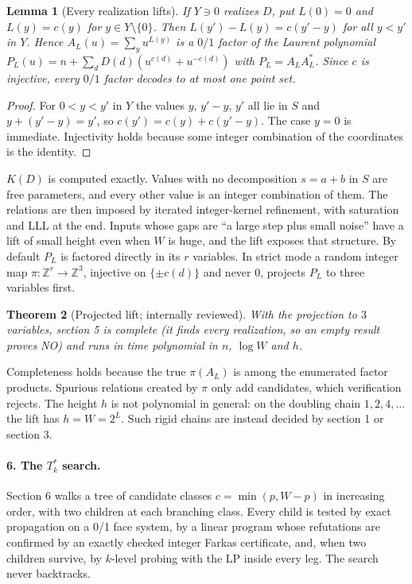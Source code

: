 \documentclass[11pt]{article}
\newtheorem{lemma}{Lemma}
\newtheorem{theorem}[lemma]{Theorem}
\theoremstyle{definition}
\newcommand{\Z}{\mathbb{Z}}
\begin{document}
\begin{lemma}[Every realization lifts]\label{lem:lift}
If $Y\ni 0$ realizes $D$, put $L(0)=0$ and $L(y)=c(y)$ for $y\in Y\setminus\{0\}$. Then $L(y')-L(y)=c(y'-y)$ for all
$y<y'$ in $Y$. Hence $A_L(u)=\sum_{y}u^{L(y)}$ is a $0/1$ factor of the Laurent polynomial
$P_L(u)=n+\sum_d D(d)(u^{c(d)}+u^{-c(d)})$ with $P_L=A_LA_L^*$. Since $c$ is injective, every $0/1$ factor decodes to
at most one point set.
\end{lemma}
\begin{proof}
For $0<y<y'$ in $Y$ the values $y$, $y'-y$, $y'$ all lie in $S$ and $y+(y'-y)=y'$, so $c(y')=c(y)+c(y'-y)$. The case
$y=0$ is immediate. Injectivity holds because some integer combination of the coordinates is the identity.
\end{proof}

$K(D)$ is computed exactly. Values with no decomposition $s=a+b$ in $S$ are free parameters, and every other value is an
integer combination of them. The relations are then imposed by iterated integer-kernel refinement, with saturation and
LLL at the end. Inputs whose gaps are ``a large step plus small noise'' have a lift of small height even when $W$ is
huge, and the lift exposes that structure. By default $P_L$ is factored directly in its $r$ variables. In strict mode a
random integer map $\pi:\Z^r\to\Z^3$, injective on $\{\pm c(d)\}$ and never $0$, projects $P_L$ to three variables
first.

\begin{theorem}[Projected lift; internally reviewed]\label{thm:t3r}
With the projection to $3$ variables, section 5 is complete (it finds every realization, so an empty result proves NO)
and runs in time polynomial in $n$, $\log W$ and $h$.
\end{theorem}

Completeness holds because the true $\pi(A_L)$ is among the enumerated factor products. Spurious relations created by
$\pi$ only add candidates, which verification rejects. The height $h$ is not polynomial in general: on the doubling
chain $1,2,4,\dots$ the lift has $h=W=2^L$. Such rigid chains are instead decided by section 1 or section 3.

\paragraph{6. The $T^*_k$ search.} Section 6 walks a tree of candidate classes $c=\min(p,W-p)$ in increasing order, with
two children at each branching class. Every child is tested by exact propagation on a 0/1 face system, by a linear
program whose refutations are confirmed by an exactly checked integer Farkas certificate, and, when two children
survive, by $k$-level probing with the LP inside every leg. The search never backtracks.
\end{document}
